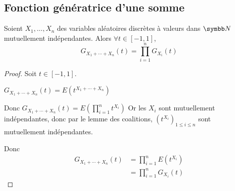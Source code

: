 \subsection{Fonction génératrice d'une somme }

\begin{theoreme}{}{}
    Soient $X_1, \dots, X_n$ des variables aléatoires discrètes à valeurs dans $\N$ mutuellement 
    indépendantes. Alors $\forall t \in [-1, 1]$,
    $$ G_{X_1 + \cdots + X_n}(t) = \prod_{i = 1}^n G_{X_i}(t) $$
\end{theoreme}

\begin{proof}
    Soit $t \in [-1, 1]$.

    $G_{X_1 + \cdots + X_n}(t) = E\left( t^{X_1 + \cdots + X_n} \right)$

    Donc $G_{X_1 + \cdots + X_n}(t) = E\left( \prod_{i = 1 }^{n } t^{X_i} \right)$
    Or les $X_i$ sont mutuellement indépendantes, donc par le lemme des coalitions, 
    $(t^{X_i})_{1 \leqslant i \leqslant n}$ sont mutuellement indépendantes.

    Donc 
    \begin{align}
        G_{X_1 + \cdots + X_n}(t) & = \prod_{i = 1 }^{ n } E\left( t^{X_i} \right) \\
        & = \prod_{i = 1 }^{ n } G_{X_i}(t)
    \end{align}
\end{proof}
